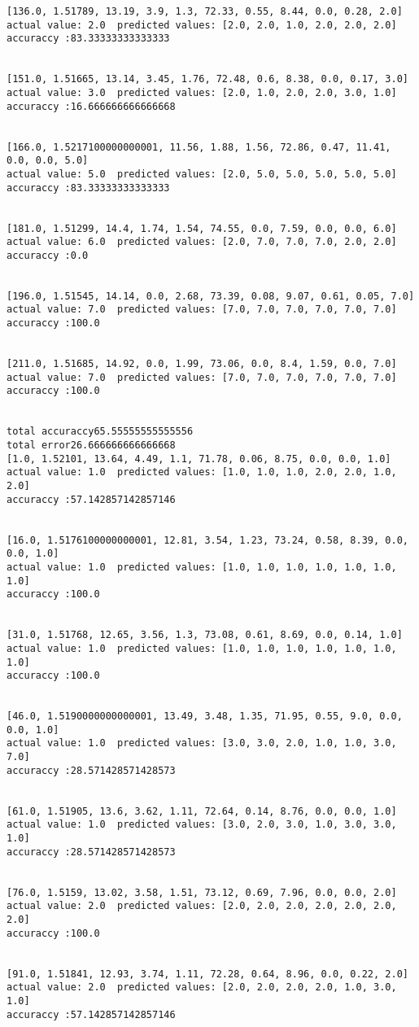 \documentclass[11pt]{article}
\begin{document}
\begin{Verbatim}[commandchars=\\\{\}]
[136.0, 1.51789, 13.19, 3.9, 1.3, 72.33, 0.55, 8.44, 0.0, 0.28, 2.0]
actual value: 2.0  predicted values: [2.0, 2.0, 1.0, 2.0, 2.0, 2.0]
accuraccy :83.33333333333333


[151.0, 1.51665, 13.14, 3.45, 1.76, 72.48, 0.6, 8.38, 0.0, 0.17, 3.0]
actual value: 3.0  predicted values: [2.0, 1.0, 2.0, 2.0, 3.0, 1.0]
accuraccy :16.666666666666668


[166.0, 1.5217100000000001, 11.56, 1.88, 1.56, 72.86, 0.47, 11.41, 0.0, 0.0, 5.0]
actual value: 5.0  predicted values: [2.0, 5.0, 5.0, 5.0, 5.0, 5.0]
accuraccy :83.33333333333333


[181.0, 1.51299, 14.4, 1.74, 1.54, 74.55, 0.0, 7.59, 0.0, 0.0, 6.0]
actual value: 6.0  predicted values: [2.0, 7.0, 7.0, 7.0, 2.0, 2.0]
accuraccy :0.0


[196.0, 1.51545, 14.14, 0.0, 2.68, 73.39, 0.08, 9.07, 0.61, 0.05, 7.0]
actual value: 7.0  predicted values: [7.0, 7.0, 7.0, 7.0, 7.0, 7.0]
accuraccy :100.0


[211.0, 1.51685, 14.92, 0.0, 1.99, 73.06, 0.0, 8.4, 1.59, 0.0, 7.0]
actual value: 7.0  predicted values: [7.0, 7.0, 7.0, 7.0, 7.0, 7.0]
accuraccy :100.0


total accuraccy65.55555555555556
total error26.666666666666668
[1.0, 1.52101, 13.64, 4.49, 1.1, 71.78, 0.06, 8.75, 0.0, 0.0, 1.0]
actual value: 1.0  predicted values: [1.0, 1.0, 1.0, 2.0, 2.0, 1.0, 2.0]
accuraccy :57.142857142857146


[16.0, 1.5176100000000001, 12.81, 3.54, 1.23, 73.24, 0.58, 8.39, 0.0, 0.0, 1.0]
actual value: 1.0  predicted values: [1.0, 1.0, 1.0, 1.0, 1.0, 1.0, 1.0]
accuraccy :100.0


[31.0, 1.51768, 12.65, 3.56, 1.3, 73.08, 0.61, 8.69, 0.0, 0.14, 1.0]
actual value: 1.0  predicted values: [1.0, 1.0, 1.0, 1.0, 1.0, 1.0, 1.0]
accuraccy :100.0


[46.0, 1.5190000000000001, 13.49, 3.48, 1.35, 71.95, 0.55, 9.0, 0.0, 0.0, 1.0]
actual value: 1.0  predicted values: [3.0, 3.0, 2.0, 1.0, 1.0, 3.0, 7.0]
accuraccy :28.571428571428573


[61.0, 1.51905, 13.6, 3.62, 1.11, 72.64, 0.14, 8.76, 0.0, 0.0, 1.0]
actual value: 1.0  predicted values: [3.0, 2.0, 3.0, 1.0, 3.0, 3.0, 1.0]
accuraccy :28.571428571428573


[76.0, 1.5159, 13.02, 3.58, 1.51, 73.12, 0.69, 7.96, 0.0, 0.0, 2.0]
actual value: 2.0  predicted values: [2.0, 2.0, 2.0, 2.0, 2.0, 2.0, 2.0]
accuraccy :100.0


[91.0, 1.51841, 12.93, 3.74, 1.11, 72.28, 0.64, 8.96, 0.0, 0.22, 2.0]
actual value: 2.0  predicted values: [2.0, 2.0, 2.0, 2.0, 1.0, 3.0, 1.0]
accuraccy :57.142857142857146



\end{Verbatim}
\end{document}
